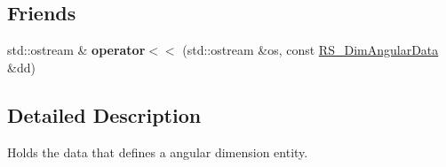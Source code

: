 \subsection*{Friends}
\begin{DoxyCompactItemize}
\item 
\hypertarget{classRS__DimAngularData_a80ecd8f62e9786e941e46713a64dc17f}{std\-::ostream \& {\bfseries operator$<$$<$} (std\-::ostream \&os, const \hyperlink{classRS__DimAngularData}{R\-S\-\_\-\-Dim\-Angular\-Data} \&dd)}\label{classRS__DimAngularData_a80ecd8f62e9786e941e46713a64dc17f}

\end{DoxyCompactItemize}


\subsection{Detailed Description}
Holds the data that defines a angular dimension entity. 

